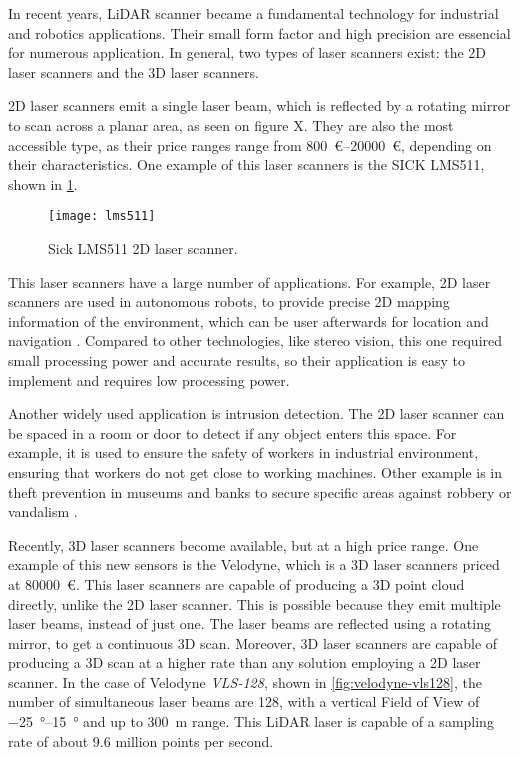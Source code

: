 In recent years, LiDAR scanner became a fundamental technology for industrial and robotics applications. Their small form factor and high precision are essencial for numerous application. In general, two types of laser scanners exist: the 2D laser scanners and the 3D laser scanners. 

2D laser scanners emit a single laser beam, which is reflected by a rotating mirror to scan across a planar area, as seen on figure X. They are also the most accessible type, as their price ranges range from \SIrange{800}{20000}{\euro}, depending on their characteristics. One example of this laser scanners is the SICK LMS511, shown in \cref{fig:sick-lms511}. 

\begin{figure}
    \centering
    \texttt{[image: lms511]}
    \caption{Sick LMS511 2D laser scanner.}
    \label{fig:sick-lms511}
\end{figure}

This laser scanners have a large number of applications. For example, 2D laser scanners are used in autonomous robots, to provide precise 2D mapping information of the environment, which can be user afterwards for location and navigation \cite{siritanawan17}. Compared to other technologies, like stereo vision, this one required small processing power and accurate results, so their application is easy to implement and requires low processing power. 

Another widely used application is intrusion detection. The 2D laser scanner can be spaced in a room or door to detect if any object enters this space. For example, it is used to ensure the safety of workers in industrial environment, ensuring that workers do not get close to working machines. Other example is in theft prevention in museums and banks to secure specific areas against robbery or vandalism \cite{sick-security}.

Recently, 3D laser scanners become available, but at a high price range. One example of this new sensors is the Velodyne, which is a 3D laser scanners priced at \SI{80000}{\euro}. This laser scanners are capable of producing a 3D point cloud directly, unlike the 2D laser scanner. This is possible because they emit multiple laser beams, instead of just one. The laser beams are reflected using a rotating mirror, to get a continuous 3D scan. Moreover, 3D laser scanners are capable of producing a 3D scan at a higher rate than any solution employing a 2D laser scanner. In the case of Velodyne \emph{VLS-128}, shown in \cref{fig:velodyne-vls128}, the number of simultaneous laser beams are \num{128}, with a vertical Field of View of \SIrange{-25}{+15}{\degree} and up to \SI{300}{\meter} range\cite{velodyne-vls128}. This LiDAR laser is capable of a sampling rate of about 9.6 million points per second.

